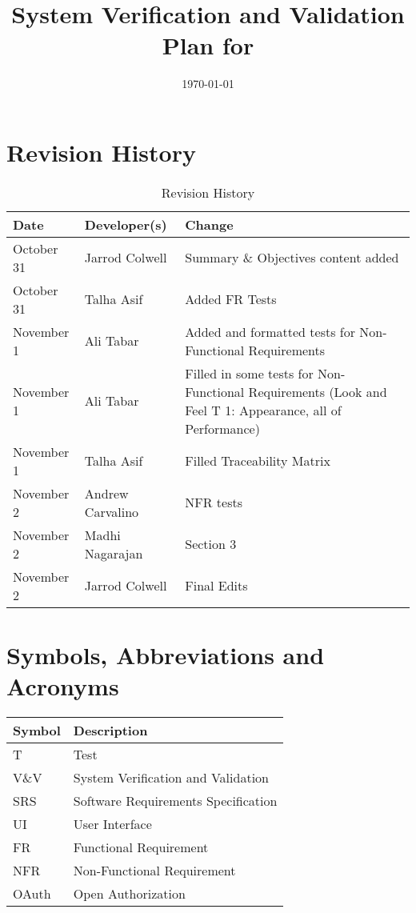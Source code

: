 \documentclass[12pt, titlepage]{article}
\begin{document}
\title{System Verification and Validation Plan for \progname{}} 
\author{\authname}
\date{\today}
	
\maketitle


\section*{Revision History}
\begin{table}[hp]
	\caption{Revision History} \label{TblRevisionHistory}
	\begin{tabularx}{\textwidth}{llX}
		\toprule
		\textbf{Date} & \textbf{Developer(s)} & \textbf{Change}\\
		\midrule
		October 31 & Jarrod Colwell & Summary \& Objectives content added\\
		\midrule
		October 31 & Talha Asif & Added FR Tests\\
		\midrule
		November 1 & Ali Tabar & Added and formatted tests for Non-Functional Requirements\\
		\midrule
		November 1 & Ali Tabar & Filled in some tests for Non-Functional Requirements (Look and Feel T 1: Appearance, all of Performance)\\
		\midrule
		November 1 & Talha Asif & Filled Traceability Matrix\\
		\midrule
		November 2 & Andrew Carvalino & NFR tests\\
		\midrule
		November 2 & Madhi Nagarajan & Section 3\\
		\midrule
		November 2 & Jarrod Colwell & Final Edits\\
		\bottomrule
	\end{tabularx}
\end{table}


\newpage

\tableofcontents

\listoftables

\newpage

\section{Symbols, Abbreviations and Acronyms}

\renewcommand{\arraystretch}{1.2}
\begin{tabular}{l | l} 
  \toprule		
  \textbf{Symbol} & \textbf{Description}\\
  \midrule 
  T & Test\\
  V\&V & System Verification and Validation\\
  SRS & Software Requirements Specification\\
  UI & User Interface\\
  FR & Functional Requirement\\
  NFR & Non-Functional Requirement\\
  OAuth & Open Authorization\\
  \bottomrule
\end{tabular}\\
\end{document}
